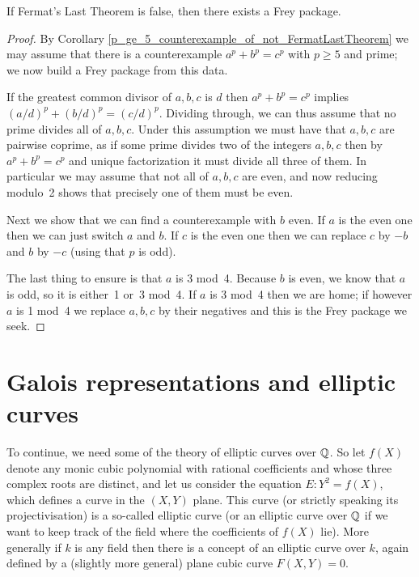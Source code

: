 \begin{lemma}\label{FLT.FreyPackage.of_not_FermatLastTheorem}\leanok{}
  If Fermat's Last Theorem is false, then there exists a Frey package.
\end{lemma}
\begin{proof} By Corollary \ref{p_ge_5_counterexample_of_not_FermatLastTheorem} we may assume that there is a counterexample $a^p+b^p=c^p$ with $p\geq 5$ and prime; we now build a Frey package from this data.
  
  If the greatest common divisor of $a,b,c$ is $d$ then $a^p+b^p=c^p$ implies $(a/d)^p+(b/d)^p=(c/d)^p$. Dividing through, we can thus assume that no prime divides all of $a,b,c$. Under this assumption we must have that $a,b,c$ are pairwise coprime, as if some prime divides two of the integers $a,b,c$ then by $a^p+b^p=c^p$ and unique factorization it must divide all three of them. In particular we may assume that not all of $a,b,c$ are even, and now reducing modulo~2 shows that precisely one of them must be even. 
  
  Next we show that we can find a counterexample with $b$ even. If $a$ is the even one then we can just switch $a$ and $b$. If $c$ is the even one then we can replace $c$ by $-b$ and $b$ by $-c$ (using that $p$ is odd).

  The last thing to ensure is that $a$ is 3 mod~4. Because $b$ is even, we know that $a$ is odd, so it is either~1 or~3 mod~4. If $a$ is 3 mod~4 then we are home; if however $a$ is 1 mod~4 we replace $a,b,c$ by their negatives and this is the Frey package we seek.
\end{proof}

\section{Galois representations and elliptic curves}\label{twopointfour}

To continue, we need some of the theory of elliptic curves over $\mathbb{Q}$. So let $f(X)$ denote any monic cubic polynomial with rational coefficients and whose three complex roots are distinct, and let us consider the equation $E:Y^2=f(X)$, which defines a curve in the $(X,Y)$ plane. This curve (or strictly speaking its projectivisation) is a so-called elliptic curve (or an elliptic curve over $\mathbb{Q}$ if we want to keep track of the field where the coefficients of $f(X)$ lie). More generally if $k$ is any field then there is a concept of an elliptic curve over $k$, again defined by a (slightly more general) plane cubic curve $F(X,Y)=0$.

